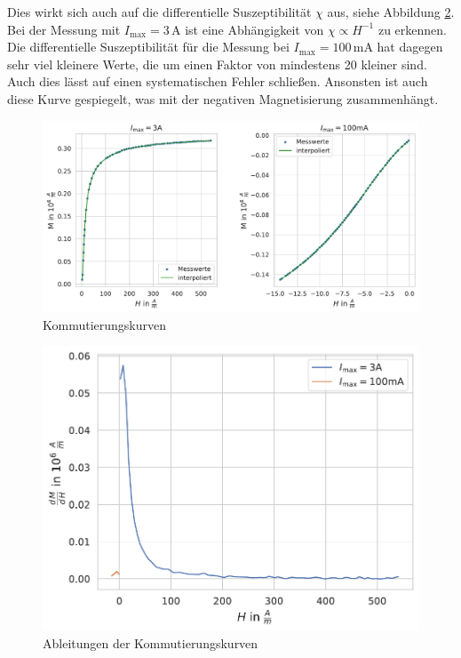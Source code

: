 \documentclass[12pt,a4paper]{scrartcl}
\numberwithin{equation}{section} %
\begin{document}
Dies wirkt sich auch auf die differentielle Suszeptibilität $\chi$ aus, siehe Abbildung \ref{Abb: diff kommut}. Bei der Messung mit $I_\mathrm{max}= 3\,\mathrm A$ ist eine Abhängigkeit von $\chi \propto H^{-1}$ zu erkennen. Die differentielle Suszeptibilität für die Messung bei $I_\mathrm{max}=100\mathrm{\,mA}$ hat dagegen sehr viel kleinere Werte, die um einen Faktor von mindestens 20 kleiner sind. Auch dies lässt auf einen systematischen Fehler schließen. Ansonsten ist auch diese Kurve gespiegelt, was mit der negativen Magnetisierung zusammenhängt.

\begin{figure}[ht]
	\centering
	\includegraphics[scale=0.6]{../media/B2.4/3.3.2_Messung.pdf}
	\caption{Kommutierungskurven}
	\label{Abb: kommut}
\end{figure}

\begin{figure}[ht]
	\centering
	\includegraphics[scale=0.7]{../media/B2.4/3.3.2_Ableitung.pdf}
	\caption{Ableitungen der Kommutierungskurven}
	\label{Abb: diff kommut}
\end{figure}
\end{document}
